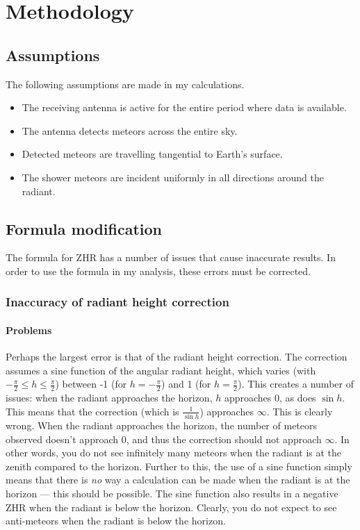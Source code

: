 \section{Methodology}
\subsection{Assumptions}
The following assumptions are made in my calculations.
\begin{itemize}
	\item The receiving antenna is active for the entire period where data is available.
	\item The antenna detects meteors across the entire sky.
	\item Detected meteors are travelling tangential to Earth's surface.
	\item The shower meteors are incident uniformly in all directions around the radiant.
\end{itemize}
\subsection{Formula modification}
The formula \cite{zhr} for ZHR has a number of issues that cause inaccurate results. In order to use the formula in my analysis, these errors must be corrected.
\subsubsection{Inaccuracy of radiant height correction}
\paragraph{Problems\\}
Perhaps the largest error is that of the radiant height correction. The correction assumes a sine function of the angular radiant height, which varies (with $-\frac{\pi}{2} \leq h \leq \frac{\pi}{2}$) between -1 (for $h = -\frac{\pi}{2}$) and 1 (for $h = \frac{\pi}{2}$). This creates a number of issues: when the radiant approaches the horizon, $h$ approaches 0, as does $\sin h$. This means that the correction (which is $\frac{1}{\sin h}$) approaches $\infty$. This is clearly wrong. When the radiant approaches the horizon, the number of meteors observed doesn't approach 0, and thus the correction should not approach $\infty$. In other words, you do not see infinitely many meteors when the radiant is at the zenith compared to the horizon. Further to this, the use of a sine function simply means that there is \textit{no} way a calculation can be made when the radiant is at the horizon --- this should be possible. The sine function also results in a negative ZHR when the radiant is below the horizon. Clearly, you do not expect to see anti-meteors when the radiant is below the horizon. 

